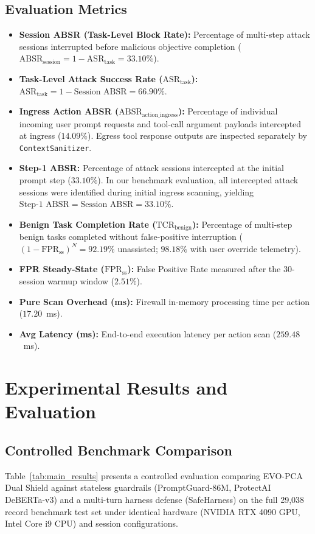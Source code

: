 \documentclass[runningheads]{llncs}
\begin{document}
\subsection{Evaluation Metrics}
\begin{itemize}
    \item \textbf{Session ABSR (Task-Level Block Rate):} Percentage of multi-step attack sessions interrupted before malicious objective completion ($\text{ABSR}_{\text{session}} = 1 - \text{ASR}_{\text{task}} = 33.10\%$).
    \item \textbf{Task-Level Attack Success Rate ($\text{ASR}_{\text{task}}$):} $\text{ASR}_{\text{task}} = 1 - \text{Session ABSR} = 66.90\%$.
    \item \textbf{Ingress Action ABSR ($\text{ABSR}_{\text{action\_ingress}}$):} Percentage of individual incoming user prompt requests and tool-call argument payloads intercepted at ingress ($14.09\%$). Egress tool response outputs are inspected separately by \texttt{ContextSanitizer}.
    \item \textbf{Step-1 ABSR:} Percentage of attack sessions intercepted at the initial prompt step ($33.10\%$). In our benchmark evaluation, all intercepted attack sessions were identified during initial ingress scanning, yielding $\text{Step-1 ABSR} = \text{Session ABSR} = 33.10\%$.
    \item \textbf{Benign Task Completion Rate ($\text{TCR}_{\text{benign}}$):} Percentage of multi-step benign tasks completed without false-positive interruption ($(1 - \text{FPR}_{\text{ss}})^N = 92.19\%$ unassisted; $98.18\%$ with user override telemetry).
    \item \textbf{FPR Steady-State ($\text{FPR}_{\text{ss}}$):} False Positive Rate measured after the 30-session warmup window ($2.51\%$).
    \item \textbf{Pure Scan Overhead (ms):} Firewall in-memory processing time per action ($17.20$~ms).
    \item \textbf{Avg Latency (ms):} End-to-end execution latency per action scan ($259.48$~ms).
\end{itemize}

\section{Experimental Results and Evaluation}

\subsection{Controlled Benchmark Comparison}
Table~\ref{tab:main_results} presents a controlled evaluation comparing EVO-PCA Dual Shield against stateless guardrails (PromptGuard-86M, ProtectAI DeBERTa-v3) and a multi-turn harness defense (SafeHarness) on the full 29,038 record benchmark test set under identical hardware (NVIDIA RTX 4090 GPU, Intel Core i9 CPU) and session configurations.
\end{document}
